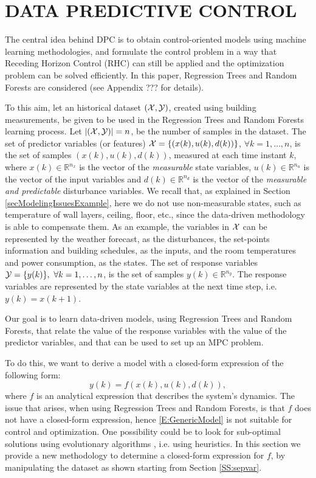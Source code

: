 \section{DATA PREDICTIVE CONTROL}
\label{S:dpc}

\textcolor[rgb]{0,0,1}{The central idea behind DPC is to obtain control-oriented models using machine learning methodologies, and formulate the control problem in a way that Receding Horizon Control (RHC) can still be applied and the optimization problem can be solved efficiently.
In this paper, Regression Trees and Random Forests are considered (see Appendix ??? for details).}

\textcolor[rgb]{0,0,1}{To this aim, let an historical dataset $(\mathcal{X},\mathcal{Y})$, created using building measurements, be given to be used in the Regression Trees and Random Forests learning process.
Let $|(\mathcal{X},\mathcal{Y})| = n$, be the number of samples in the dataset.
The set of predictor variables (or features) $\mathcal{X} = \{(x(k),u(k),d(k))\}$, $\forall k = 1,\ldots,n$, is the set of samples $(x(k),u(k),d(k))$, measured at each time instant $k$, where $x(k)\in\mathbb{R}^{n_x}$ is the vector of the \emph{measurable} state variables, $u(k)\in\mathbb{R}^{n_u}$ is the vector of the input variables and $d(k)\in\mathbb{R}^{n_d}$ is the vector of the \emph{measurable and predictable} disturbance variables.
We recall that, as explained in Section \ref{secModelingIssuesExample}, here we do not use non-measurable states, such as temperature of wall layers, ceiling, floor, etc., since the data-driven methodology is able to compensate them.
As an example, the variables in $\mathcal{X}$ can be represented by the weather forecast, as the disturbances, the set-points information and building schedules, as the inputs, and the room temperatures and power consumption, as the states. 
The set of response variables $\mathcal{Y} = \{y(k)\},\ \forall k = 1,\ldots,n$, is the set of samples $y(k)\in\mathbb{R}^{n_y}$.
The response variables are represented by the state variables at the next time step, i.e. $y(k) = x(k+1)$.}

\textcolor[rgb]{0,0,1}{Our goal is to learn data-driven models, using Regression Trees and Random Forests, that relate the value of the response variables with the value of the predictor variables, and that can be used to set up an MPC problem.
}

\textcolor[rgb]{0,0,1}{To do this, we want to derive a model with a closed-form expression of the following form:
\begin{equation}\label{E:GenericModel}
	y(k)=f(x(k),u(k),d(k)),
\end{equation}
where $f$ is an analytical expression that describes the system's dynamics.
The issue that arises, when using Regression Trees and Random Forests, is that $f$ does not have a closed-form expression, hence \eqref{E:GenericModel} is not suitable for control and optimization.
One possibility could be to look for sub-optimal solutions using evolutionary algorithms \cite{Kusiak2009}, i.e. using heuristics.
In this section we provide a new methodology to determine a closed-form expression for $f$, by manipulating the dataset as shown starting from Section \ref{SS:sepvar}.}


